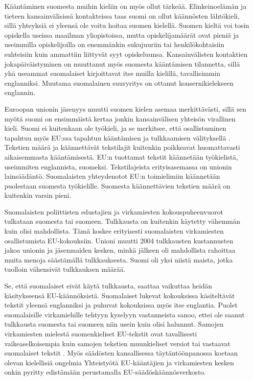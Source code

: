\documentclass[]{../../metanetpaper}
\begin{document}
\begin{Parallel}[c]{77mm}{77mm}
{Kääntäminen suomesta muihin kieliin on myös ollut
tärkeää. Elinkeinoelämän ja tieteen kansainvälisissä kontakteissa taas
suomi on ollut käännösten lähtökieli, sillä yhteyksiä ei yleensä ole
voitu hoitaa suomen kielellä. Suomen kieltä voi tosin opiskella
useissa maailman yliopistoissa, mutta opiskelijamäärät ovat pieniä ja
useimmilla opiskelijoilla on enemmänkin sukujuuriin tai
henkilökohtaisiin suhteisiin kuin ammattiin liittyvät syyt
opiskeluunsa. Kansainvälisten kontaktien jokapäiväistyminen on
muuttanut myös suomesta kääntämisen tilannetta, sillä yhä useammat
suomalaiset kirjoittavat itse muilla kielillä, tavallisimmin
englanniksi. Muutama suomalainen suuryritys on ottanut
konsernikielekseen englannin.

Euroopan unionin jäsenyys muutti suomen kielen asemaa merkittävästi,
sillä sen myötä suomi on ensimmäistä kertaa jonkin kansainvälisen
yhteisön virallinen kieli. Suomi ei kuitenkaan ole työkieli, ja se
merkitsee, että osallistuminen tapahtuu myös EU:ssa tapahtuu
kääntämisen ja tulkkaamisen välityksellä \cite{Tulevaisuus2009}.
Tekstien määrä ja käännettävät tekstilajit kuitenkin poikkeavat
huomattavasti aikaisemmasta kääntämisestä. EU:n tuottamat tekstit
käännetään työkielistä, useimmiten englannista, suomeksi.
Tekstilajeista erityisasemassa on unionin lainsäädäntö. Suomalaisten
yhteydenotot EU:n toimielimiin käännetään puolestaan suomesta
työkielille. Suomesta käännettävien tekstien määrä on kuitenkin varsin
pieni.

Suomalaisten poliittisten edustajien ja virkamiesten
kokouspuheenvuorot tulkataan suomesta tai suomeen. Tulkkausta on
kuitenkin käytetty vähemmän kuin olisi mahdollista. Tämä koskee
erityisesti suomalaisten virkamiesten osallistumista
EU-kokouksiin. Unioni muutti 2004 tulkkausten kustannusten jakoa
unionin ja jäsenmaiden kesken, minkä jälkeen oli mahdollista rahoittaa
muita menoja säästämällä tulkkauksesta. Suomi oli yksi niistä maista,
jotka tuolloin vähensivät tulkkauksen määrää.

Se, että suomalaiset eivät käytä tulkkausta, saattaa vaikuttaa heidän
käsitykseensä EU-käännöksistä. Suomalaiset lukevat kokouksissa
käsiteltävät tekstit yleensä englanniksi ja puhuvat kokouksissa myös
itse englantia. Puolet suomalaisille virkamiehille tehtyyn kyselyyn
vastanneista sanoo, ettei ole saanut tulkkausta suomesta tai suomeen
niin usein kuin olisi halunnut. Samojen virkamiesten mielestä
suomenkieliset EU-tekstit ovat tavallisesti vaikeaselkoisempia kuin
samojen tekstien muunkieliset versiot tai vastaavat suomalaiset
tekstit \cite{Piehl2008}. Myös säädösten kansallisessa
täytäntöönpanossa koetaan olevan kielellisiä ongelmia
\cite{OECD2010-en} Yhteistyötä EU-kääntäjien ja virkamiesten kesken
onkin pyritty edistämään perustamalla EU-säädöskäännösverkosto.

}
\end{Parallel}
\end{document}
